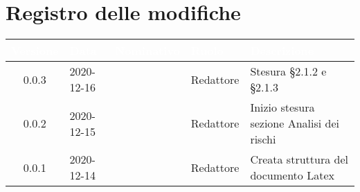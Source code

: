 \section*{Registro delle modifiche}
{
\renewcommand{\arraystretch}{1.5}
\centering
\begin{longtable}{c C{2.6cm} C{3cm} C{2.6cm} C{5cm}}
\textcolor{white}{\textbf{Versione}}&
\textcolor{white}{\textbf{Data}}&
\textcolor{white}{\textbf{Nominativo}}&
\textcolor{white}{\textbf{Ruolo}}&
\textcolor{white}{\textbf{Descrizione}}\\	
\endhead

0.0.3 & 2020-12-16 & \BM{} & Redattore & Stesura \S 2.1.2 e \S 2.1.3 \\		
0.0.2 & 2020-12-15 & \BM{} & Redattore & Inizio stesura sezione Analisi dei rischi \\
0.0.1 & 2020-12-14 & \SG{} & Redattore & Creata struttura del documento Latex \\
		
\end{longtable}
}
